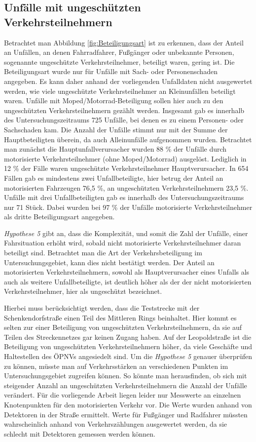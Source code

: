 \subsection{Unfälle mit ungeschützten Verkehrsteilnehmern}
Betrachtet man Abbildung \ref{fig:Beteiligungsart} ist zu erkennen, dass der Anteil an Unfällen, an denen Fahrradfahrer, Fußgänger oder unbekannte Personen, sogenannte ungeschützte Verkehrsteilnehmer, beteiligt waren, gering ist. Die Beteiligungsart wurde nur für Unfälle mit Sach- oder Personenschaden angegeben. Es kann daher anhand der vorliegenden Unfalldaten nicht ausgewertet werden, wie viele ungeschützte Verkehrsteilnehmer an Kleinunfällen beteiligt waren. Unfälle mit Moped/Motorrad-Beteiligung sollen hier auch zu den ungeschützten Verkehrsteilnehmern gezählt werden. Insgesamt gab es innerhalb des Untersuchungszeitraums 725 Unfälle, bei denen es zu einem Personen- oder Sachschaden kam. Die Anzahl der Unfälle stimmt nur mit der Summe der Hauptbeteiligten überein, da auch Alleinunfälle aufgenommen wurden. Betrachtet man zunächst die Hauptunfallverursacher wurden 88 \% der Unfälle durch motorisierte Verkehrsteilnehmer (ohne Moped/Motorrad) ausgelöst. Lediglich in 12 \% der Fälle waren ungeschützte Verkehrsteilnehmer Hauptverursacher. In 654 Fällen gab es mindestens zwei Unfallbeteiligte, hier betrug der Anteil an motorisierten Fahrzeugen 76,5 \%, an ungeschützten Verkehrsteilnehmern 23,5 \%. Unfälle mit drei Unfallbeteiligten gab es innerhalb des Untersuchungszeitraums nur 71 Stück. Dabei wurden bei 97 \% der Unfälle motorisierte Verkehrsteilnehmer als dritte Beteiligungsart angegeben.

\textit{Hypothese 5} gibt an, dass die Komplexität, und somit die Zahl der Unfälle, einer Fahrsituation erhöht wird, sobald nicht motorisierte Verkehrsteilnehmer daran beteiligt sind. Betrachtet man die Art der Verkehrsbeteiligung im Untersuchungsgebiet, kann dies nicht bestätigt werden. Der Anteil an motorisierten Verkehrsteilnehmern, sowohl als Hauptverursacher eines Unfalls als auch als weitere Unfallbeteiligte, ist deutlich höher als der der nicht motorisierten Verkehrsteilnehmer, hier als ungeschützt bezeichnet. 

Hierbei muss berücksichtigt werden, dass die Teststrecke mit der Schenkendorfstraße einen Teil des Mittleren Rings beinhaltet. Hier kommt es selten zur einer Beteiligung von ungeschützten Verkehrsteilnehmern, da sie auf Teilen des Streckennetzes gar keinen Zugang haben. Auf der Leopoldstraße ist die Beteiligung von ungeschützten Verkehrsteilnehmern höher, da viele Geschäfte und Haltestellen des ÖPNVs angesiedelt sind. Um die \textit{Hypothese 5} genauer überprüfen zu können, müsste man auf Verkehrsstärken an verschiedenen Punkten im Untersuchungsgebiet zugreifen können. So könnte man herausfinden, ob sich mit steigender Anzahl an ungeschützten Verkehrsteilnehmern die Anzahl der Unfälle verändert. Für die vorliegende Arbeit liegen leider nur Messwerte an einzelnen Knotenpunkten für den motorisierten Verkehr vor. Die Werte wurden anhand von Detektoren in der Straße ermittelt. Werte für Fußgänger und Radfahrer müssten wahrscheinlich anhand von Verkehrszählungen ausgewertet werden, da sie schlecht mit Detektoren gemessen werden können. %

